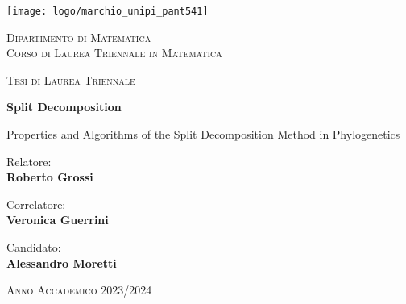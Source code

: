 
\newlength{\mylen}
\setlength{\mylen}{1cm}

\newlength{\frnleft}

\newlength{\frnright}
    {}
    {}



\begin{titlepage}
\begin{center}
    \texttt{[image: logo/marchio\_unipi\_pant541]}
    \vspace*{0.75\mylen}

    {\large \scshape
        Dipartimento di Matematica \\[0.5em]%
        Corso di Laurea Triennale in Matematica%
    }
    \vspace*{2\mylen}

    {\large \scshape
        Tesi di Laurea Triennale%
    }
    \vspace*{1.5\mylen}
    
    {\huge
        \textbf{Split Decomposition}%
    }
    \vspace*{0.75\mylen}

    {\LARGE
        Properties and Algorithms of the Split Decomposition Method in Phylogenetics%
    }
    \vspace*{2.75\mylen}

    \begin{minipage}[t]{0.47\textwidth}\large
        {Relatore:} \vspace{0.5em} \\
            {\Large \textbf{Roberto Grossi}} \vspace{1.5em}
        
        {Correlatore:} \vspace{0.5em} \\
            {\Large \textbf{Veronica Guerrini}}
    \end{minipage}
    \hfill
    \begin{minipage}[t]{0.47\textwidth}\raggedleft\large
        {Candidato:} \hspace{-0.9em} \vspace{0.5em} \\
            {\Large \textbf{Alessandro Moretti}}
    \end{minipage}

    \vfill
    
    {\large \scshape
        Anno Accademico 2023/2024%
    }
\end{center}
\end{titlepage}


\restoregeometry